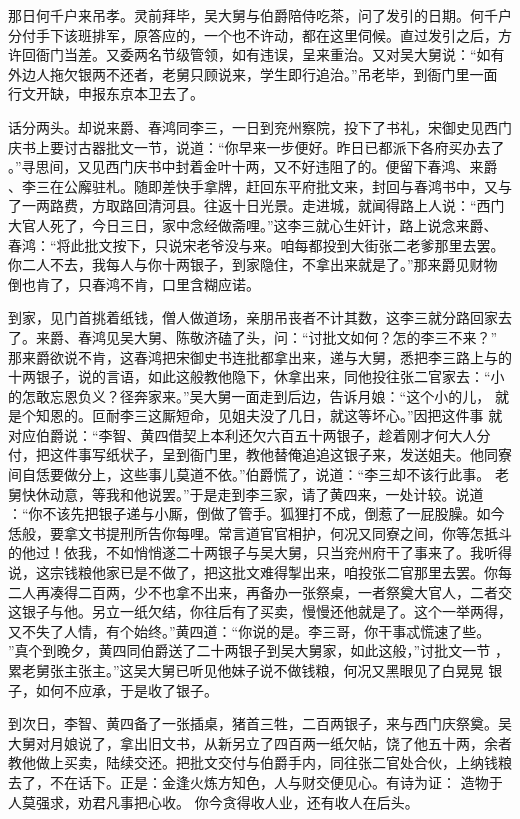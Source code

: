 那日何千户来吊孝。灵前拜毕，吴大舅与伯爵陪侍吃茶，问了发引的日期。何千户
分付手下该班排军，原答应的，一个也不许动，都在这里伺候。直过发引之后，方
许回衙门当差。又委两名节级管领，如有违误，呈来重治。又对吴大舅说：“如有
外边人拖欠银两不还者，老舅只顾说来，学生即行追治。”吊老毕，到衙门里一面
行文开缺，申报东京本卫去了。

话分两头。却说来爵、春鸿同李三，一日到兖州察院，投下了书礼，宋御史见西门
庆书上要讨古器批文一节，说道：“你早来一步便好。昨日已都派下各府买办去了
。”寻思间，又见西门庆书中封着金叶十两，又不好违阻了的。便留下春鸿、来爵
、李三在公廨驻札。随即差快手拿牌，赶回东平府批文来，封回与春鸿书中，又与
了一两路费，方取路回清河县。往返十日光景。走进城，就闻得路上人说：“西门
大官人死了，今日三日，家中念经做斋哩。”这李三就心生奸计，路上说念来爵、
春鸿：“将此批文按下，只说宋老爷没与来。咱每都投到大街张二老爹那里去罢。
你二人不去，我每人与你十两银子，到家隐住，不拿出来就是了。”那来爵见财物
倒也肯了，只春鸿不肯，口里含糊应诺。

到家，见门首挑着纸钱，僧人做道场，亲朋吊丧者不计其数，这李三就分路回家去
了。来爵、春鸿见吴大舅、陈敬济磕了头，问：“讨批文如何？怎的李三不来？”
那来爵欲说不肯，这春鸿把宋御史书连批都拿出来，递与大舅，悉把李三路上与的
十两银子，说的言语，如此这般教他隐下，休拿出来，同他投往张二官家去：“小
的怎敢忘恩负义？径奔家来。”吴大舅一面走到后边，告诉月娘：“这个小的儿，
就是个知恩的。叵耐李三这厮短命，见姐夫没了几日，就这等坏心。”因把这件事
就对应伯爵说：“李智、黄四借契上本利还欠六百五十两银子，趁着刚才何大人分
付，把这件事写纸状子，呈到衙门里，教他替俺追追这银子来，发送姐夫。他同寮
间自恁要做分上，这些事儿莫道不依。”伯爵慌了，说道：“李三却不该行此事。
老舅快休动意，等我和他说罢。”于是走到李三家，请了黄四来，一处计较。说道
：“你不该先把银子递与小厮，倒做了管手。狐狸打不成，倒惹了一屁股臊。如今
恁般，要拿文书提刑所告你每哩。常言道官官相护，何况又同寮之间，你等怎抵斗
的他过！依我，不如悄悄遂二十两银子与吴大舅，只当兖州府干了事来了。我听得
说，这宗钱粮他家已是不做了，把这批文难得掣出来，咱投张二官那里去罢。你每
二人再凑得二百两，少不也拿不出来，再备办一张祭桌，一者祭奠大官人，二者交
这银子与他。另立一纸欠结，你往后有了买卖，慢慢还他就是了。这个一举两得，
又不失了人情，有个始终。”黄四道：“你说的是。李三哥，你干事忒慌速了些。
”真个到晚夕，黄四同伯爵送了二十两银子到吴大舅家，如此这般，”讨批文一节
，累老舅张主张主。”这吴大舅已听见他妹子说不做钱粮，何况又黑眼见了白晃晃
银子，如何不应承，于是收了银子。

到次日，李智、黄四备了一张插桌，猪首三牲，二百两银子，来与西门庆祭奠。吴
大舅对月娘说了，拿出旧文书，从新另立了四百两一纸欠帖，饶了他五十两，余者
教他做上买卖，陆续交还。把批文交付与伯爵手内，同往张二官处合伙，上纳钱粮
去了，不在话下。正是：金逢火炼方知色，人与财交便见心。有诗为证：
造物于人莫强求，劝君凡事把心收。
你今贪得收人业，还有收人在后头。
